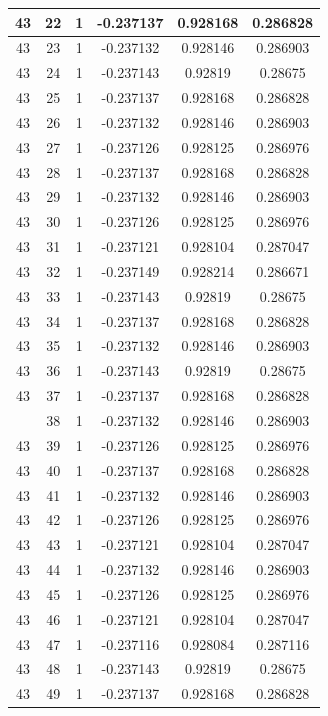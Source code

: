 \documentclass[12pt,a4paper]{article}
\numberwithin{equation}{section}
\numberwithin{figure}{section}
\numberwithin{table}{section}
\begin{document}
\begin{longtable}{|c|c|c|c|c|c|}
43 & 22 & 1 & -0.237137 & 0.928168 & 0.286828 \\ \hline
43 & 23 & 1 & -0.237132 & 0.928146 & 0.286903 \\ \hline
43 & 24 & 1 & -0.237143 & 0.92819 & 0.28675 \\ \hline
43 & 25 & 1 & -0.237137 & 0.928168 & 0.286828 \\ \hline
43 & 26 & 1 & -0.237132 & 0.928146 & 0.286903 \\ \hline
43 & 27 & 1 & -0.237126 & 0.928125 & 0.286976 \\ \hline
43 & 28 & 1 & -0.237137 & 0.928168 & 0.286828 \\ \hline
43 & 29 & 1 & -0.237132 & 0.928146 & 0.286903 \\ \hline
43 & 30 & 1 & -0.237126 & 0.928125 & 0.286976 \\ \hline
43 & 31 & 1 & -0.237121 & 0.928104 & 0.287047 \\ \hline
43 & 32 & 1 & -0.237149 & 0.928214 & 0.286671 \\ \hline
43 & 33 & 1 & -0.237143 & 0.92819 & 0.28675 \\ \hline
43 & 34 & 1 & -0.237137 & 0.928168 & 0.286828 \\ \hline
43 & 35 & 1 & -0.237132 & 0.928146 & 0.286903 \\ \hline
43 & 36 & 1 & -0.237143 & 0.92819 & 0.28675 \\ \hline
43 & 37 & 1 & -0.237137 & 0.928168 & 0.286828 \\ \hline
\pagebreak
43 & 38 & 1 & -0.237132 & 0.928146 & 0.286903 \\ \hline
43 & 39 & 1 & -0.237126 & 0.928125 & 0.286976 \\ \hline
43 & 40 & 1 & -0.237137 & 0.928168 & 0.286828 \\ \hline
43 & 41 & 1 & -0.237132 & 0.928146 & 0.286903 \\ \hline
43 & 42 & 1 & -0.237126 & 0.928125 & 0.286976 \\ \hline
43 & 43 & 1 & -0.237121 & 0.928104 & 0.287047 \\ \hline
43 & 44 & 1 & -0.237132 & 0.928146 & 0.286903 \\ \hline
43 & 45 & 1 & -0.237126 & 0.928125 & 0.286976 \\ \hline
43 & 46 & 1 & -0.237121 & 0.928104 & 0.287047 \\ \hline
43 & 47 & 1 & -0.237116 & 0.928084 & 0.287116 \\ \hline
43 & 48 & 1 & -0.237143 & 0.92819 & 0.28675 \\ \hline
43 & 49 & 1 & -0.237137 & 0.928168 & 0.286828 \\ \hline

\end{longtable}
\end{document}
